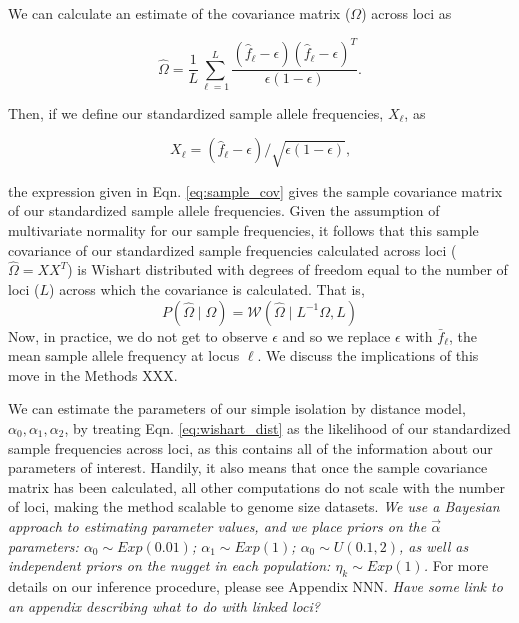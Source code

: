 \documentclass[12pt]{article}
\newcommand{\gb}[1]{{\em \color{magenta} #1}}
\newcommand{\gc}[1]{{\em \color{blue} #1}}
\begin{document}
We can calculate an estimate of the covariance matrix ($\Omega$) across loci as 

\begin{equation}
\label{eq:sample_cov}
\widehat{\Omega} = \frac{1}{L} \sum_{\ell=1}^{L} \frac{(\hat{f}_{\ell}  - \epsilon) (\hat{f}_{\ell}  - \epsilon)^T}{\epsilon(1-\epsilon)} \text{.}
\end{equation}

Then, if we define our standardized sample allele frequencies, $X_\ell$, as

\begin{equation}
\label{eq:standardized_sample_freqs}
X_\ell = (\hat{f}_{\ell}  - \epsilon)/\sqrt{\epsilon(1-\epsilon)}\text{,}
\end{equation}

the expression given in Eqn. \eqref{eq:sample_cov} gives the sample covariance matrix of our standardized sample allele frequencies.
Given the assumption of multivariate normality for our sample frequencies, it follows that this sample covariance of our standardized sample frequencies calculated across loci ($\widehat{\Omega} = X X^T$) is Wishart distributed with degrees of freedom equal to the number of loci ($L$) across which the covariance is calculated.
That is, 
\begin{equation}
\label{eq:wishart_dist}
P(\widehat{\Omega} \mid \Omega) = \mathcal{W}\left(\widehat{\Omega} \mid L^{-1} \Omega,L \right)
\end{equation}
Now, in practice, we do not get to observe $\epsilon$ and so we replace $\epsilon$ with $\bar{f}_{\ell}$, the mean sample allele frequency at locus  $\ell$. We discuss the implications of this move in the Methods XXX.

We can estimate the parameters of our simple isolation by distance model, $\alpha_0,\alpha_1, \alpha_2$, by treating Eqn. \eqref{eq:wishart_dist} as the likelihood of our standardized sample frequencies across loci, as this contains all of the information about our parameters of interest.  Handily, it also means that once the sample covariance matrix has been calculated, all other computations do not scale with the number of loci, making the method scalable to genome size datasets.  \gb{We use a Bayesian approach to estimating parameter values, and we place priors on the $\vec{\alpha}$ parameters: $\alpha_0 \sim Exp(0.01)$;  $\alpha_1 \sim Exp(1)$;  $\alpha_0 \sim U(0.1,2)$, as well as independent priors on the nugget in each population: $\eta_k \sim Exp(1)$.}  For more details on our inference procedure, please see Appendix NNN.  \gc{Have some link to an appendix describing what to do with linked loci?}
\end{document}
